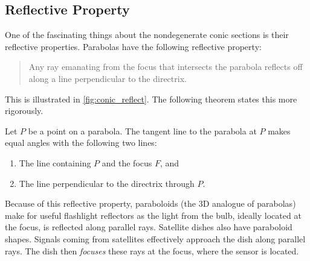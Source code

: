 {\subsection{Reflective Property}

One of the fascinating things about the nondegenerate conic sections is their reflective properties. Parabolas have the following reflective property:

\begin{quote}
	Any ray emanating from the focus that intersects the parabola reflects off along a line perpendicular to the directrix.
\end{quote}

This is illustrated in \autoref{fig:conic_reflect}. The following theorem states this more rigorously.

	
\begin{theorem}\label{thm:parabola_reflect}
Let $P$ be a point on a parabola. The tangent line to the parabola at $P$ makes equal angles with the following two lines:
\begin{enumerate}
	\item	The line containing $P$ and the focus $F$, and
	\item	The line perpendicular to the directrix through $P$.
\end{enumerate}
\end{theorem}


Because of this reflective property, paraboloids (the 3D analogue of parabolas) make for useful flashlight reflectors as the light from the bulb, ideally located at the focus, is reflected along parallel rays. Satellite dishes also have paraboloid shapes. Signals coming from satellites effectively approach the dish along parallel rays. The dish then \emph{focuses} these rays at the focus, where the sensor is located.
}

